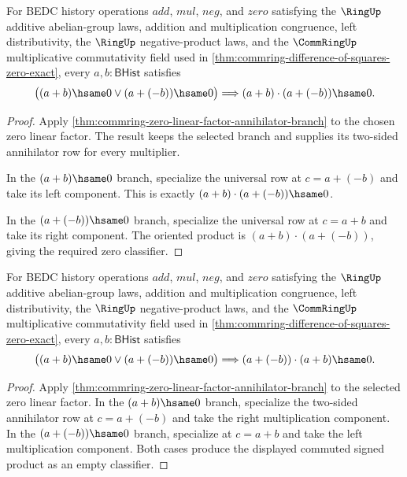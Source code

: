 \begin{theorem}
\label{thm:commring-zero-linear-factor-signed-product-zero}
For BEDC history operations $add$, $mul$, $neg$, and $zero$ satisfying the
$\RingUp$ additive abelian-group laws, addition and multiplication congruence,
left distributivity, the $\RingUp$ negative-product laws, and the
$\CommRingUp$ multiplicative commutativity field used in
\autoref{thm:commring-difference-of-squares-zero-exact}, every
$a,b : \mathsf{BHist}$ satisfies
$$
\bigl((a+b)\hsame0 \lor (a+(-b))\hsame0\bigr)
\Longrightarrow
(a+b)\cdot(a+(-b))\hsame0 .
$$
\end{theorem}
\begin{proof}
Apply \autoref{thm:commring-zero-linear-factor-annihilator-branch} to the chosen
zero linear factor. The result keeps the selected branch and supplies its
two-sided annihilator row for every multiplier.

In the $(a+b)\hsame0$ branch, specialize the universal row at
$c=a+(-b)$ and take its left component. This is exactly
$(a+b)\cdot(a+(-b))\hsame0$.

In the $(a+(-b))\hsame0$ branch, specialize the universal row at $c=a+b$ and
take its right component. The oriented product is
$(a+b)\cdot(a+(-b))$, giving the required zero classifier.
\end{proof}

\begin{theorem}
\label{thm:commring-zero-linear-factor-commuted-signed-product-zero}
For BEDC history operations $add$, $mul$, $neg$, and $zero$ satisfying the
$\RingUp$ additive abelian-group laws, addition and multiplication congruence,
left distributivity, the $\RingUp$ negative-product laws, and the
$\CommRingUp$ multiplicative commutativity field used in
\autoref{thm:commring-difference-of-squares-zero-exact}, every
$a,b : \mathsf{BHist}$ satisfies
$$
\bigl((a+b)\hsame0 \lor (a+(-b))\hsame0\bigr)
\Longrightarrow
(a+(-b))\cdot(a+b)\hsame0 .
$$
\end{theorem}
\begin{proof}
Apply \autoref{thm:commring-zero-linear-factor-annihilator-branch} to the
selected zero linear factor. In the $(a+b)\hsame0$ branch, specialize the
two-sided annihilator row at $c=a+(-b)$ and take the right multiplication
component. In the $(a+(-b))\hsame0$ branch, specialize at $c=a+b$ and take the
left multiplication component. Both cases produce the displayed commuted
signed product as an empty classifier.
\end{proof}

